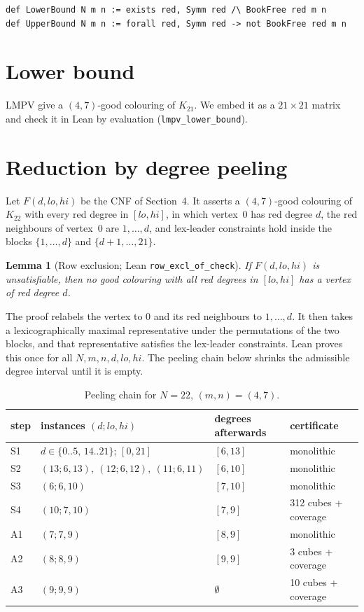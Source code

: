 \documentclass[11pt]{amsart}
\newtheorem{lemma}[theorem]{Lemma}
\theoremstyle{definition}
\begin{document}
\begin{lstlisting}
def LowerBound N m n := exists red, Symm red /\ BookFree red m n
def UpperBound N m n := forall red, Symm red -> not BookFree red m n
\end{lstlisting}

\section{Lower bound}

LMPV \cite{LMPV} give a $(4,7)$-good colouring of $K_{21}$. We embed
it as a $21\times 21$ matrix and check it in Lean by evaluation
(\texttt{lmpv\_lower\_bound}).

\section{Reduction by degree peeling}

Let $F(d,lo,hi)$ be the CNF of Section~4. It asserts a $(4,7)$-good
colouring of $K_{22}$ with every red degree in $[lo,hi]$, in which
vertex~$0$ has red degree $d$, the red neighbours of vertex~$0$ are
$1,\dots,d$, and lex-leader constraints hold inside the blocks
$\{1,\dots,d\}$ and $\{d+1,\dots,21\}$.

\begin{lemma}[Row exclusion; Lean \texttt{row\_excl\_of\_check}]
If $F(d,lo,hi)$ is unsatisfiable, then no good colouring with all red
degrees in $[lo,hi]$ has a vertex of red degree $d$.
\end{lemma}

The proof relabels the vertex to $0$ and its red neighbours to
$1,\dots,d$. It then takes a lexicographically maximal representative
under the permutations of the two blocks, and that representative
satisfies the lex-leader constraints. Lean proves this once for all
$N,m,n,d,lo,hi$. The peeling chain below shrinks the admissible degree
interval until it is empty.

\begin{table}[h]
\centering
\caption{Peeling chain for $N=22$, $(m,n)=(4,7)$.}
\begin{tabular}{llll}
\toprule
step & instances $(d;lo,hi)$ & degrees afterwards & certificate \\
\midrule
S1 & $d\in\{0..5,\,14..21\}$; $[0,21]$ & $[6,13]$ & monolithic \\
S2 & $(13;6,13),\ (12;6,12),\ (11;6,11)$ & $[6,10]$ & monolithic \\
S3 & $(6;6,10)$ & $[7,10]$ & monolithic \\
S4 & $(10;7,10)$ & $[7,9]$ & 312 cubes + coverage \\
A1 & $(7;7,9)$ & $[8,9]$ & monolithic \\
A2 & $(8;8,9)$ & $[9,9]$ & 3 cubes + coverage \\
A3 & $(9;9,9)$ & $\emptyset$ & 10 cubes + coverage \\
\bottomrule
\end{tabular}
\end{table}
\end{document}
